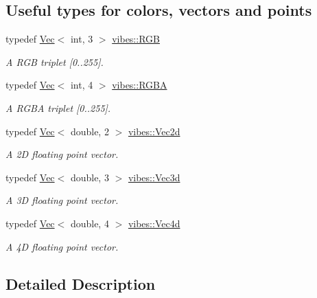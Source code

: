\subsection*{Useful types for colors, vectors and points}
\begin{DoxyCompactItemize}
\item 
\mbox{\label{group__params_gaaacd30b512a79f94ed7ca73276ecd6f9}} 
typedef \hyperlink{structvibes_1_1_vec}{Vec}$<$ int, 3 $>$ \hyperlink{group__params_gaaacd30b512a79f94ed7ca73276ecd6f9}{vibes\+::\+R\+GB}
\begin{DoxyCompactList}\small\item\em A R\+GB triplet \mbox{[}0..255\mbox{]}. \end{DoxyCompactList}\item 
\mbox{\label{group__params_gaf49197546b6ee693cc82733217f205ba}} 
typedef \hyperlink{structvibes_1_1_vec}{Vec}$<$ int, 4 $>$ \hyperlink{group__params_gaf49197546b6ee693cc82733217f205ba}{vibes\+::\+R\+G\+BA}
\begin{DoxyCompactList}\small\item\em A R\+G\+BA triplet \mbox{[}0..255\mbox{]}. \end{DoxyCompactList}\item 
\mbox{\label{group__params_gaf3161ff170c192763988ec53f8f6ee5f}} 
typedef \hyperlink{structvibes_1_1_vec}{Vec}$<$ double, 2 $>$ \hyperlink{group__params_gaf3161ff170c192763988ec53f8f6ee5f}{vibes\+::\+Vec2d}
\begin{DoxyCompactList}\small\item\em A 2D floating point vector. \end{DoxyCompactList}\item 
\mbox{\label{group__params_gadb53848603b272f3dba56c538387a624}} 
typedef \hyperlink{structvibes_1_1_vec}{Vec}$<$ double, 3 $>$ \hyperlink{group__params_gadb53848603b272f3dba56c538387a624}{vibes\+::\+Vec3d}
\begin{DoxyCompactList}\small\item\em A 3D floating point vector. \end{DoxyCompactList}\item 
\mbox{\label{group__params_gaa6359a0627a612d93c3d007436b7d505}} 
typedef \hyperlink{structvibes_1_1_vec}{Vec}$<$ double, 4 $>$ \hyperlink{group__params_gaa6359a0627a612d93c3d007436b7d505}{vibes\+::\+Vec4d}
\begin{DoxyCompactList}\small\item\em A 4D floating point vector. \end{DoxyCompactList}\end{DoxyCompactItemize}


\subsection{Detailed Description}
